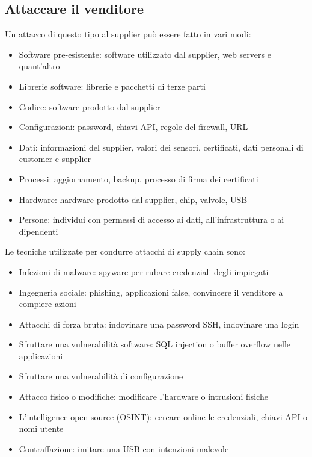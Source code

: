 \subsection{Attaccare il venditore}
Un attacco di questo tipo al supplier può essere fatto in vari modi:
\begin{itemize}[noitemsep]
    \item Software pre-esistente: software utilizzato dal supplier, web servers e quant'altro
    \item Librerie software: librerie e pacchetti di terze parti
    \item Codice: software prodotto dal supplier
    \item Configurazioni: password, chiavi API, regole del firewall, URL
    \item Dati: informazioni del supplier, valori dei sensori, certificati, dati personali di customer e supplier
    \item Processi: aggiornamento, backup, processo di firma dei certificati
    \item Hardware: hardware prodotto dal supplier, chip, valvole, USB
    \item Persone: individui con permessi di accesso ai dati, all'infrastruttura o ai dipendenti
\end{itemize}
Le tecniche utilizzate per condurre attacchi di supply chain sono:
\begin{itemize}[noitemsep]
    \item Infezioni di malware: spyware per rubare credenziali degli impiegati
    \item Ingegneria sociale: phishing, applicazioni false, convincere il venditore a compiere azioni
    \item Attacchi di forza bruta: indovinare una password SSH, indovinare una login
    \item Sfruttare una vulnerabilità software: SQL injection o buffer overflow nelle applicazioni
    \item Sfruttare una vulnerabilità di configurazione
    \item Attacco fisico o modifiche: modificare l'hardware o intrusioni fisiche
    \item L'intelligence open-source (OSINT): cercare online le credenziali, chiavi API o nomi utente
    \item Contraffazione: imitare una USB con intenzioni malevole
\end{itemize}

